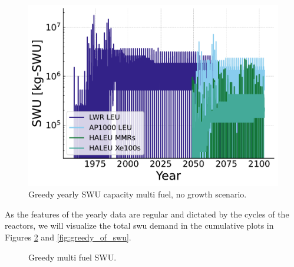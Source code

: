\begin{figure}[H]
    \centering
    \includegraphics[scale=0.7]{images/results/swu/multi_dgng_swu_by_fuel.pdf}
    \caption{Greedy yearly SWU capacity multi fuel, no growth scenario.}
    \label{fig:swu_yearly_greedy}
\end{figure}

As the features of the yearly data are regular and dictated by the cycles of the reactors, we will visualize the total \gls{swu} demand in the cumulative plots in Figures \ref{fig:greedy_mf_swu} and \ref{fig:greedy_of_swu}.

\begin{figure}[H]
  \hfill
  \caption{Greedy multi fuel SWU.}
  \label{fig:greedy_mf_swu}
\end{figure}


